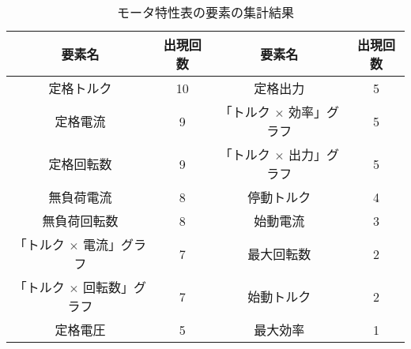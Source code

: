 \begin{table}[t]
	\centering
	\caption{モータ特性表の要素の集計結果}
	\begin{tabular}{|c|c||c|c|} \hline
		要素名 & 出現回数 & 要素名 & 出現回数 \\ \hline\hline
		定格トルク & 10 & 定格出力 & 5 \\ \hline
		定格電流 & 9 & 「トルク $\times$ 効率」グラフ & 5 \\ \hline
		定格回転数 & 9 & 「トルク $\times$ 出力」グラフ & 5 \\ \hline
		無負荷電流 & 8 & 停動トルク & 4 \\ \hline
		無負荷回転数 & 8  & 始動電流 & 3 \\ \hline
		「トルク $\times$ 電流」グラフ & 7 &  最大回転数 & 2 \\ \hline
		「トルク $\times$ 回転数」グラフ & 7 & 始動トルク & 2\\ \hline
		定格電圧 & 5 & 最大効率 & 1 \\ \hline
		
		
	\end{tabular}
	 \label{tab:syuukei}
  \end{table}

